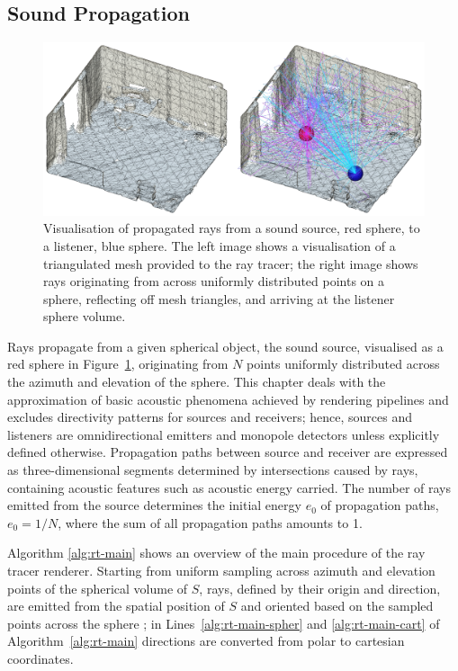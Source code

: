 \subsection{Sound Propagation}
\begin{figure}
    \centering
    \includegraphics[width=1\linewidth]{rt-room-test}
    \caption{Visualisation of propagated rays from a sound source, red sphere, to a listener, blue sphere. The left image shows a visualisation of a triangulated mesh provided to the ray tracer; the right image shows rays originating from across uniformly distributed points on a sphere, reflecting off mesh triangles, and arriving at the listener sphere volume.}
    \label{fig:rt-room-demo}
\end{figure}
Rays propagate from a given spherical object, the sound source, visualised as a red sphere in Figure~\ref{fig:rt-room-demo}, originating from $N$ points uniformly distributed across the azimuth and elevation of the sphere. This chapter deals with the approximation of basic acoustic phenomena achieved by rendering pipelines and excludes directivity patterns for sources and receivers; hence, sources and listeners are omnidirectional emitters and monopole detectors unless explicitly defined otherwise. Propagation paths between source and receiver are expressed as three-dimensional segments determined by intersections caused by rays, containing acoustic features such as acoustic energy carried. The number of rays emitted from the source determines the initial energy $e_0$ of propagation paths, $e_0 = 1 / N$, where the sum of all propagation paths amounts to 1. \par
Algorithm \ref{alg:rt-main} shows an overview of the main procedure of the ray tracer renderer. Starting from uniform sampling across azimuth and elevation points of the spherical volume of $S$, rays, defined by their origin and direction, are emitted from the spatial position of $S$ and oriented based on the sampled points across the sphere \citep{shirley2008realistic}; in Lines~\ref{alg:rt-main-spher} and \ref{alg:rt-main-cart} of Algorithm~\ref{alg:rt-main} directions are converted from polar to cartesian coordinates.\par


